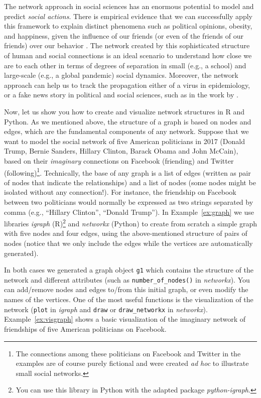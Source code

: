 The network approach in social sciences has an enormous potential to model and predict \textit{social actions}. There is empirical evidence that we can successfully apply this framework to explain distinct phenomena such as political opinions, obesity, and happiness, given the influence of our friends (or even of the friends of our friends) over our behavior \citep{christakis2009connected}. The network created by this sophisticated structure of human and social connections is an ideal scenario to understand how close we are to each other in terms of degrees of separation \citep{watts2004six} in small (e.g., a school) and large-scale (e.g., a global pandemic) social dynamics. Moreover, the network approach can help us to track the propagation either of a virus in epidemiology, or a fake news story in political and social sciences, such as in the work by
\citet{vosoughi2018spread}.

Now, let us show you how to create and visualize network structures in R and Python. As we mentioned above, the structure of a graph is based on nodes and edges, which are the fundamental components of any network. Suppose that we want to model the social network of five American politicians in 2017 (Donald Trump, Bernie Sanders, Hillary Clinton, Barack Obama and John McCain), based on their \textit{imaginary} connections on Facebook (friending) and Twitter (following)\footnote{The connections among these politicians on Facebook and Twitter in the examples are of course purely fictional and were created \textit{ad hoc} to illustrate small social networks.}. Technically, the base of any graph is a list of edges (written as pair of nodes that indicate the relationships) and a list of nodes (some nodes might be isolated without any connection!).  For instance, the friendship on Facebook between two politicians would normally be expressed as two strings separated by comma (e.g., ``Hillary Clinton'', ``Donald Trump''). In Example~\ref{ex:graph} we use libraries \emph{igraph} (R)\footnote{You can use this library in Python with the adapted package \emph{python-igraph}.} and \emph{networkx} (Python) to create from scratch a simple graph with five nodes and four edges, using the above-mentioned structure of pairs of nodes (notice that we only include the edges while the vertices are automatically generated).


In both cases we generated a graph object \texttt{g1} which contains the structure of the network and different attributes (such as \verb|number_of_nodes()| in \emph{networkx}). You can add/remove nodes and edges to/from this initial graph, or even modify the names of the vertices. One of the most useful functions is the visualization of the network (\texttt{plot} in \emph{igraph} and \texttt{draw} or \texttt{draw\_networkx} in \emph{networkx}). Example~\ref{ex:visgraph} shows a basic visualization of the imaginary network of friendships of five American politicians on Facebook.


